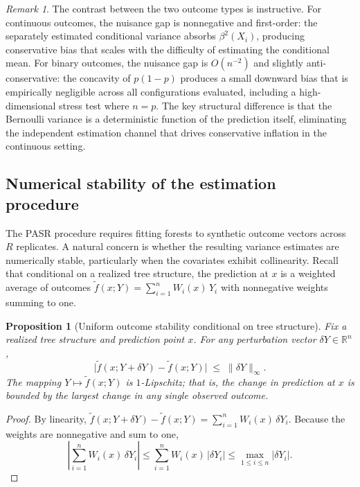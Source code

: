 \documentclass[11pt]{article}
\theoremstyle{plain}
\newtheorem{proposition}{Proposition}
\theoremstyle{definition}
\theoremstyle{remark}
\newtheorem{remark}{Remark}
\begin{document}
\begin{remark}
	\label{rem:binary_vs_continuous}
	The contrast between the two outcome types is instructive. For continuous outcomes, the nuisance gap is nonnegative and first-order: the separately estimated conditional variance absorbs $\beta^2(X_i)$, producing conservative bias that scales with the difficulty of estimating the conditional mean. For binary outcomes, the nuisance gap is $O(n^{-2})$ and slightly anti-conservative: the concavity of $p(1-p)$ produces a small downward bias that is empirically negligible across all configurations evaluated, including a high-dimensional stress test where $n = p$. The key structural difference is that the Bernoulli variance is a deterministic function of the prediction itself, eliminating the independent estimation channel that drives conservative inflation in the continuous setting.
\end{remark}

\subsection{Numerical stability of the estimation procedure}
\label{subsec:numerical_stability}

The PASR procedure requires fitting forests to synthetic outcome vectors across $R$ replicates. A natural concern is whether the resulting variance estimates are numerically stable, particularly when the covariates exhibit collinearity. Recall that conditional on a realized tree structure, the prediction at $x$ is a weighted average of outcomes $\tilde f(x;Y) = \sum_{i=1}^n W_i(x)\,Y_i$ with nonnegative weights summing to one.

\begin{proposition}[Uniform outcome stability conditional on tree structure]
	\label{prop:lipschitz_rf}
	Fix a realized tree structure and prediction point \(x\). For any perturbation vector \(\delta Y\in\mathbb R^n\),
	\[
	\bigl|\tilde f(x;Y+\delta Y)-\tilde f(x;Y)\bigr|
	\;\le\;
	\|\delta Y\|_\infty.
	\]
	The mapping $Y\mapsto\tilde f(x;Y)$ is $1$-Lipschitz; that is, the change in prediction at $x$ is bounded by the largest change in any single observed outcome.
\end{proposition}

\begin{proof}
	By linearity,
	$\tilde f(x;Y+\delta Y)-\tilde f(x;Y) = \sum_{i=1}^n W_i(x)\,\delta Y_i$.
	Because the weights are nonnegative and sum to one,
	\[
	\left|\sum_{i=1}^n W_i(x)\,\delta Y_i\right|
	\le
	\sum_{i=1}^n W_i(x)\,|\delta Y_i|
	\le
	\max_{1\le i\le n}|\delta Y_i|.
	\]
\end{proof}
\end{document}
